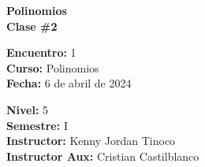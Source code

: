 \begin{center} \textbf
{
    \Large Polinomios \\ \vspace{2mm}Clase \#2
}
\end{center}

\begin{multicols}{2}
{
    \textbf{Encuentro:} 1\\
    \textbf{Curso:} Polinomios\\
    \textbf{Fecha:} 6 de abril de 2024\\
    \begin{flushright}
        \textbf{Nivel:} 5\\
        \textbf{Semestre:} I\\
        \textbf{Instructor:} Kenny Jordan Tinoco\\
        \textbf{Instructor Aux:} Cristian Castilblanco
    \end{flushright}
}
\end{multicols}

\thispagestyle{first-page-style}
